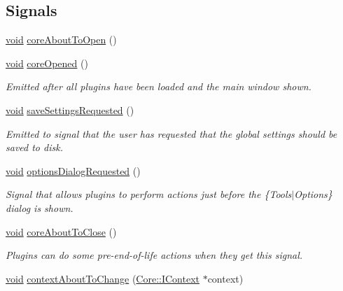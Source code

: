 \subsection*{Signals}
\begin{DoxyCompactItemize}
\item 
\hyperlink{group___u_a_v_objects_plugin_ga444cf2ff3f0ecbe028adce838d373f5c}{void} \hyperlink{group___core_plugin_ga10069a0bda308595dfad2aabf5d4a711}{core\-About\-To\-Open} ()
\item 
\hyperlink{group___u_a_v_objects_plugin_ga444cf2ff3f0ecbe028adce838d373f5c}{void} \hyperlink{group___core_plugin_ga1b43a0185eb3abefdae4d893e653843d}{core\-Opened} ()
\begin{DoxyCompactList}\small\item\em Emitted after all plugins have been loaded and the main window shown. \end{DoxyCompactList}\item 
\hyperlink{group___u_a_v_objects_plugin_ga444cf2ff3f0ecbe028adce838d373f5c}{void} \hyperlink{group___core_plugin_ga5deecf671e1390e1489d696dd89f112d}{save\-Settings\-Requested} ()
\begin{DoxyCompactList}\small\item\em Emitted to signal that the user has requested that the global settings should be saved to disk. \end{DoxyCompactList}\item 
\hyperlink{group___u_a_v_objects_plugin_ga444cf2ff3f0ecbe028adce838d373f5c}{void} \hyperlink{group___core_plugin_gafba7e27b9e0330206e2c77eebbeb7038}{options\-Dialog\-Requested} ()
\begin{DoxyCompactList}\small\item\em Signal that allows plugins to perform actions just before the \{Tools$|$\-Options\} dialog is shown. \end{DoxyCompactList}\item 
\hyperlink{group___u_a_v_objects_plugin_ga444cf2ff3f0ecbe028adce838d373f5c}{void} \hyperlink{group___core_plugin_ga36e71fe35d26feb63b78a56f08159f17}{core\-About\-To\-Close} ()
\begin{DoxyCompactList}\small\item\em Plugins can do some pre-\/end-\/of-\/life actions when they get this signal. \end{DoxyCompactList}\item 
\hyperlink{group___u_a_v_objects_plugin_ga444cf2ff3f0ecbe028adce838d373f5c}{void} \hyperlink{group___core_plugin_ga682fdb2c297d6f8d9b7340dbb58699ec}{context\-About\-To\-Change} (\hyperlink{class_core_1_1_i_context}{Core\-::\-I\-Context} $\ast$context)

\end{DoxyCompactItemize}
